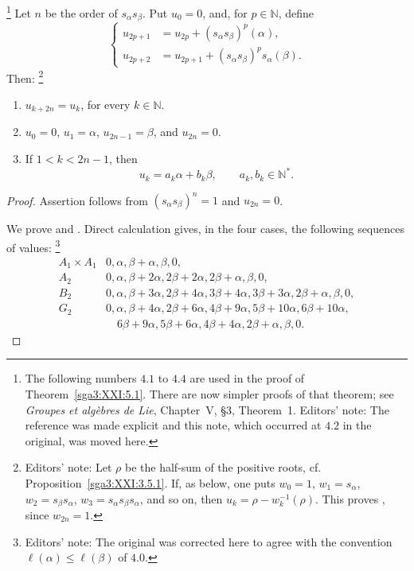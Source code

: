 
\begin{proposition}\label{sga3:XXI:4.1}
\footnote{The following numbers \(4.1\) to \(4.4\) are used in the
proof of Theorem~\ref{sga3:XXI:5.1}. There are now simpler proofs of
that theorem; see \emph{Groupes et algèbres de Lie}, Chapter~V,
\S3, Theorem~1. Editors' note: The reference was made explicit and
this note, which occurred at \(4.2\) in the original, was moved here.}
Let \(n\) be the order of \(s_\alpha s_\beta\). Put \(u_0=0\), and,
for \(p\in\mathbb N\), define
\[
\left\{
\begin{aligned}
u_{2p+1}&=u_{2p}+(s_\alpha s_\beta)^p(\alpha),\\
u_{2p+2}&=u_{2p+1}+(s_\alpha s_\beta)^p s_\alpha(\beta).
\end{aligned}
\right.
\]
Then:
\footnote{Editors' note: Let \(\rho\) be the half-sum of the positive
roots, cf. Proposition~\ref{sga3:XXI:3.5.1}. If, as below, one puts
\(w_0=1\), \(w_1=s_\alpha\), \(w_2=s_\beta s_\alpha\),
\(w_3=s_\alpha s_\beta s_\alpha\), and so on, then
\(u_k=\rho-w_k^{-1}(\rho)\). This proves , since \(w_{2n}=1\).}
\begin{enumerate}
\item[\SGAInlineRefTarget{sga3:XXI:4.1:item:i}(i)] \(u_{k+2n}=u_k\), for every \(k\in\mathbb N\).
\item[\SGAInlineRefTarget{sga3:XXI:4.1:item:ii}(ii)] \(u_0=0\), \(u_1=\alpha\), \(u_{2n-1}=\beta\),
and \(u_{2n}=0\).
\item[(iii)] If \(1<k<2n-1\), then
\[
 u_k=a_k\alpha+b_k\beta,
 \qquad a_k,b_k\in\mathbb N^\ast.
\]
\end{enumerate}
\end{proposition}

\begin{proof}
Assertion  follows from \((s_\alpha s_\beta)^n=1\) and
\(u_{2n}=0\).

We prove  and . Direct calculation gives, in the four cases,
the following sequences of values:
\footnote{Editors' note: The original was corrected here to agree
with the convention \(\ell(\alpha)\le\ell(\beta)\) of \(4.0\).}
\[
\begin{array}{c|l}
A_1\times A_1&0,\alpha,\beta+\alpha,\beta,0,\\[2pt]
A_2&0,\alpha,\beta+2\alpha,2\beta+2\alpha,
       2\beta+\alpha,\beta,0,\\[2pt]
B_2&0,\alpha,\beta+3\alpha,2\beta+4\alpha,
       3\beta+4\alpha,3\beta+3\alpha,2\beta+\alpha,\beta,0,\\[2pt]
G_2&0,\alpha,\beta+4\alpha,2\beta+6\alpha,
       4\beta+9\alpha,5\beta+10\alpha,6\beta+10\alpha,\\
   &\quad 6\beta+9\alpha,5\beta+6\alpha,4\beta+4\alpha,
       2\beta+\alpha,\beta,0.
\end{array}
\]
\end{proof}

